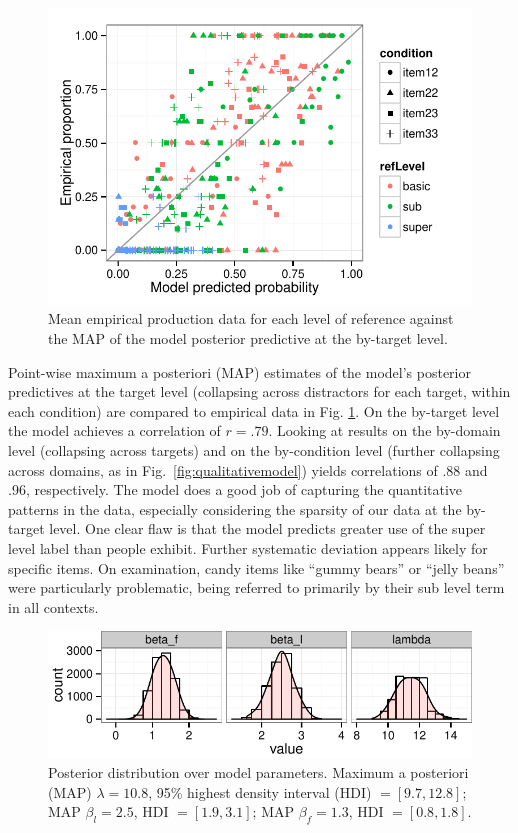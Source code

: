 \documentclass[10pt,letterpaper]{article}
\newcommand{\figref}[1]{Fig.~\ref{#1}}
\begin{document}
\begin{figure}[t!]
\centering
\includegraphics[width=.5\textwidth]{graphs/scatterplot}
\caption{Mean empirical production data for each level of reference against the MAP of the model posterior predictive at the by-target level.}
 \label{fig:scatterplot}
\end{figure}

Point-wise maximum a posteriori (MAP) estimates of the model's posterior predictives at the target level (collapsing across distractors for each target, within each condition) are compared to empirical data in Fig. \ref{fig:scatterplot}. On the by-target level the model achieves a correlation of $r = .79$. Looking at results on the by-domain level (collapsing across targets) and on the by-condition level (further collapsing across domains, as in \figref{fig:qualitativemodel}) yields correlations of .88 and .96, respectively. 
The model does a good job of capturing the quantitative patterns in the data, especially considering the sparsity of our data at the by-target level.
One clear flaw is that the model predicts greater use of the super level label than people exhibit.
Further systematic deviation appears likely for specific items. 
On examination, candy items like ``gummy bears'' or ``jelly beans'' were particularly problematic, being referred to primarily by their sub level term in all contexts.

\begin{figure}
\includegraphics[width=.49\textwidth]{graphs/parameterposteriors.pdf}
\caption{Posterior distribution over model parameters. Maximum a posteriori (MAP) $\lambda = 10.8$, 95\% highest density interval (HDI) $= [9.7, 12.8]$; MAP $\beta_l = 2.5$, HDI $= [1.9, 3.1]$; MAP $\beta_f = 1.3$, HDI $= [0.8, 1.8]$.}
\label{fig:paramposteriors}
\end{figure}
\end{document}
